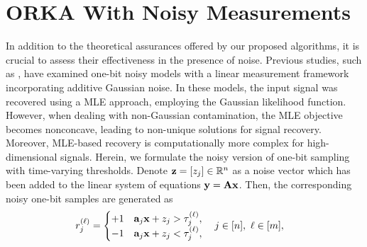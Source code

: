 \documentclass[12pt,draftcls,onecolumn]{IEEEtran}
\begin{document}
\section{ORKA With Noisy Measurements}
\label{NOISE}
In addition to the theoretical assurances offered by our proposed algorithms, it is crucial to assess their effectiveness in the presence of noise. Previous studies, such as \cite{zymnis2009compressed, eamaz2022phase}, have examined one-bit noisy models with a linear measurement framework incorporating additive Gaussian noise. In these models, the input signal was recovered using a MLE approach, employing the Gaussian likelihood function. However, when dealing with non-Gaussian contamination, the MLE objective becomes nonconcave, leading to non-unique solutions for signal recovery. Moreover, MLE-based recovery is computationally more complex for high-dimensional signals. %
Herein, we formulate the noisy version of one-bit sampling with time-varying thresholds. Denote $\mathbf{z}=[z_{j}]\in\mathbb{R}^{n}$ as a noise vector which has been added to the linear system of equations $\mathbf{y}=\mathbf{A}\mathbf{x}$. Then, the corresponding noisy one-bit samples are generated as
\begin{equation}
\label{St_8}
\begin{aligned}
r_{j}^{(\ell)} &= \begin{cases} +1 & \mba_j\mbx+z_j>\tau_{j}^{(\ell)},\\ -1 & \mba_j\mbx+z_j<\tau_{j}^{(\ell)},
\end{cases}
\quad j\in[n],~\ell\in[m],
\end{aligned}
\end{equation}
\end{document}
